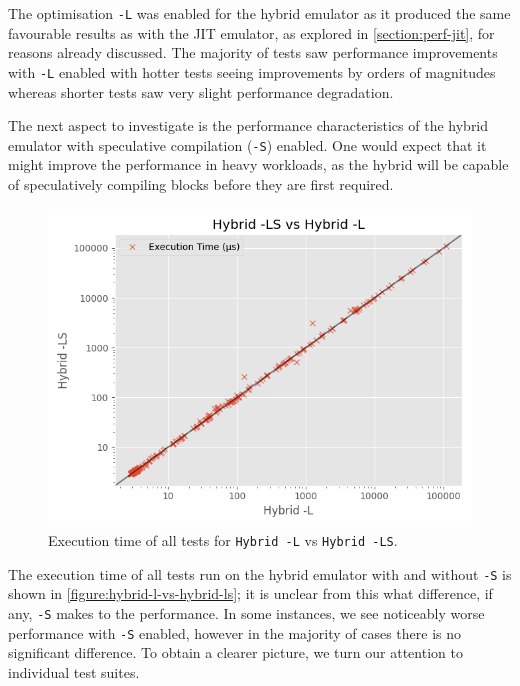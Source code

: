 The optimisation \texttt{-L} was enabled for the hybrid emulator as it produced the same favourable results as with the JIT emulator, as explored in \autoref{section:perf-jit}, for reasons already discussed. The majority of tests saw performance improvements with \texttt{-L} enabled with hotter tests seeing improvements by orders of magnitudes whereas shorter tests saw very slight performance degradation.

The next aspect to investigate is the performance characteristics of the hybrid emulator with speculative compilation (\texttt{-S}) enabled. One would expect that it might improve the performance in heavy workloads, as the hybrid will be capable of speculatively compiling blocks before they are first required. 

\begin{figure}[H]
    \centering
    \includegraphics[scale=0.75]{output/graphs/scatter/vs/Hybrid -L-vs-Hybrid -LS-time.png}
    \caption{Execution time of all tests for \texttt{Hybrid -L} vs \texttt{Hybrid -LS}.}
    \label{figure:hybrid-l-vs-hybrid-ls}
\end{figure}

The execution time of all tests run on the hybrid emulator with and without \texttt{-S} is shown in \autoref{figure:hybrid-l-vs-hybrid-ls}; it is unclear from this what difference, if any, \texttt{-S} makes to the performance. In some instances, we see noticeably worse performance with \texttt{-S} enabled, however in the majority of cases there is no significant difference. To obtain a clearer picture, we turn our attention to individual test suites.

